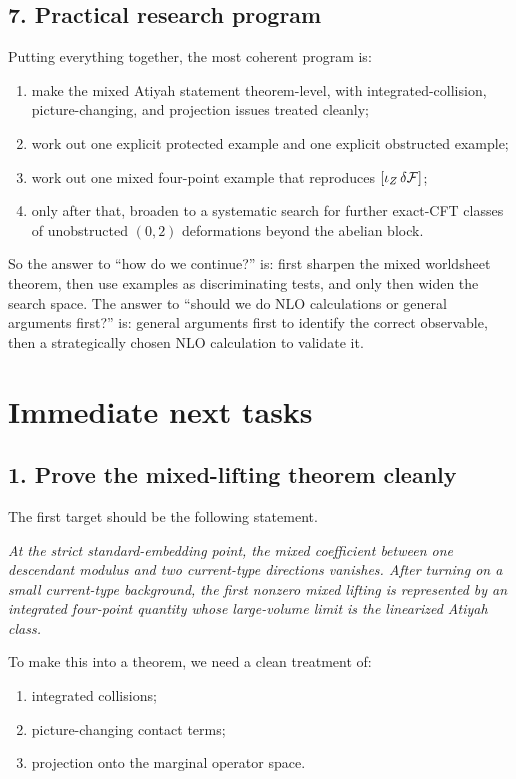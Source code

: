 \documentclass[11pt]{article}
\begin{document}
\subsection*{7. Practical research program}

Putting everything together, the most coherent program is:
\begin{enumerate}
\item make the mixed Atiyah statement theorem-level, with integrated-collision, picture-changing, and projection issues treated cleanly;
\item work out one explicit protected example and one explicit obstructed example;
\item work out one mixed four-point example that reproduces $[\iota_Z\,\delta{\cal F}]$;
\item only after that, broaden to a systematic search for further exact-CFT classes of unobstructed $(0,2)$ deformations beyond the abelian block.
\end{enumerate}

So the answer to ``how do we continue?'' is: first sharpen the mixed worldsheet theorem, then use examples as discriminating tests, and only then widen the search space. The answer to ``should we do NLO calculations or general arguments first?'' is: general arguments first to identify the correct observable, then a strategically chosen NLO calculation to validate it.

\section{Immediate next tasks}

\subsection*{1. Prove the mixed-lifting theorem cleanly}

The first target should be the following statement.

\medskip
\noindent
\emph{At the strict standard-embedding point, the mixed coefficient between one descendant modulus and two current-type directions vanishes. After turning on a small current-type background, the first nonzero mixed lifting is represented by an integrated four-point quantity whose large-volume limit is the linearized Atiyah class.}
\medskip

To make this into a theorem, we need a clean treatment of:
\begin{enumerate}
\item integrated collisions;
\item picture-changing contact terms;
\item projection onto the marginal operator space.
\end{enumerate}
\end{document}
